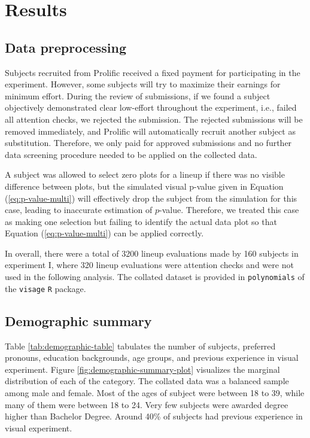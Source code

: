 \documentclass[]{interact}
\theoremstyle{plain}%
\theoremstyle{definition}
\theoremstyle{remark}
\begin{document}
\hypertarget{results}{%
\section{Results}\label{results}}

\hypertarget{data-preprocessing}{%
\subsection{Data preprocessing}\label{data-preprocessing}}

Subjects recruited from Prolific received a fixed payment for
participating in the experiment. However, some subjects will try to
maximize their earnings for minimum effort. During the review of
submissions, if we found a subject objectively demonstrated clear
low-effort throughout the experiment, i.e., failed all attention checks,
we rejected the submission. The rejected submissions will be removed
immediately, and Prolific will automatically recruit another subject as
substitution. Therefore, we only paid for approved submissions and no
further data screening procedure needed to be applied on the collected
data.

A subject was allowed to select zero plots for a lineup if there was no
visible difference between plots, but the simulated visual p-value given
in Equation (\ref{eq:p-value-multi}) will effectively drop the subject
from the simulation for this case, leading to inaccurate estimation of
\(p\)-value. Therefore, we treated this case as making one selection but
failing to identify the actual data plot so that Equation
(\ref{eq:p-value-multi}) can be applied correctly.

In overall, there were a total of 3200 lineup evaluations made by 160
subjects in experiment I, where 320 lineup evaluations were attention
checks and were not used in the following analysis. The collated dataset
is provided in \texttt{polynomials} of the \texttt{visage} \texttt{R}
package.

\hypertarget{demographic-summary}{%
\subsection{Demographic summary}\label{demographic-summary}}

Table \ref{tab:demographic-table} tabulates the number of subjects,
preferred pronouns, education backgrounds, age groups, and previous
experience in visual experiment. Figure
\ref{fig:demographic-summary-plot} visualizes the marginal distribution
of each of the category. The collated data was a balanced sample among
male and female. Most of the ages of subject were between 18 to 39,
while many of them were between 18 to 24. Very few subjects were awarded
degree higher than Bachelor Degree. Around 40\% of subjects had previous
experience in visual experiment.
\end{document}
